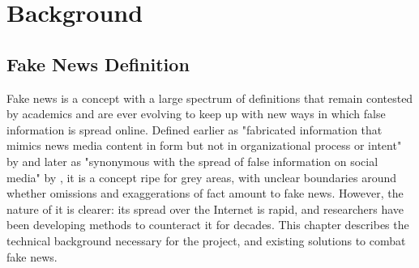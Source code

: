 \documentclass{l4proj}
\begin{document}






\chapter{Background}
\label{chap:background}

\section{Fake News Definition}

Fake news is a concept with a large spectrum of definitions that remain contested by academics and are ever evolving to keep up with new ways in which false information is spread online. Defined earlier as "fabricated information that mimics news media
content in form but not in organizational process or intent" by \cite{FakeNewsScience} 
and later as "synonymous with the spread of false information on social media" by 
\cite{FakeNewsTrends}, it is a concept ripe for grey areas, with unclear boundaries around whether omissions and exaggerations of fact amount to fake news. However, the nature of it is clearer: its spread over the Internet is rapid, and researchers have been developing methods to counteract it for decades. This chapter describes the technical background necessary for the project, and existing solutions to combat fake news.
\end{document}
